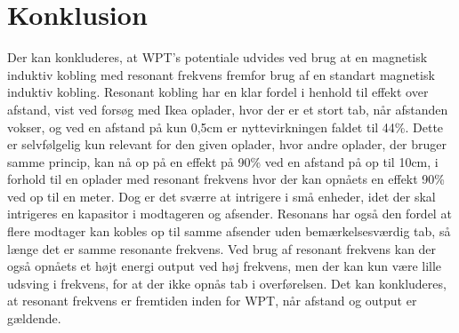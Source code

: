 \section{Konklusion}
Der kan konkluderes, at WPT's potentiale udvides ved brug at en magnetisk induktiv kobling med resonant frekvens fremfor brug af en standart magnetisk induktiv kobling. Resonant kobling har en klar fordel i henhold til effekt over afstand, vist ved forsøg med Ikea oplader, hvor der er et stort tab, når afstanden vokser, og ved en afstand på kun 0,5cm er nyttevirkningen faldet til 44\%. Dette er selvfølgelig kun relevant for den given oplader, hvor andre oplader, der bruger samme princip, kan nå op på en effekt på 90\% ved en afstand på op til 10cm, i forhold til en oplader med resonant frekvens hvor der kan opnåets en effekt 90\% ved op til en meter. Dog er det sværre at intrigere i små enheder, idet der skal intrigeres en kapasitor i modtageren og afsender. Resonans har også den fordel at flere modtager kan kobles op til samme afsender uden bemærkelsesværdig tab, så længe det er samme resonante frekvens. Ved brug af resonant frekvens kan der også opnåets et højt energi output ved høj frekvens, men der kan kun være lille udsving i frekvens, for at der ikke opnås tab i overførelsen. Det kan konkluderes, at resonant frekvens er fremtiden inden for WPT, når afstand og output er gældende.